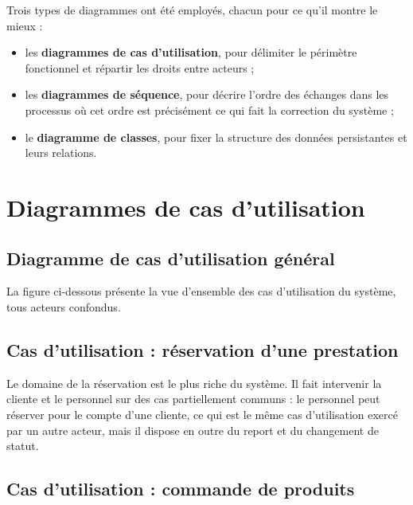 Trois types de diagrammes ont été employés, chacun pour ce qu'il montre le
mieux :

\begin{itemize}[leftmargin=1.2cm]
  \item les \textbf{diagrammes de cas d'utilisation}, pour délimiter le
  périmètre fonctionnel et répartir les droits entre acteurs ;
  \item les \textbf{diagrammes de séquence}, pour décrire l'ordre des échanges
  dans les processus où cet ordre est précisément ce qui fait la correction du
  système ;
  \item le \textbf{diagramme de classes}, pour fixer la structure des données
  persistantes et leurs relations.
\end{itemize}

\section{Diagrammes de cas d'utilisation}

\subsection{Diagramme de cas d'utilisation général}

La figure ci-dessous présente la vue d'ensemble des cas d'utilisation du
système, tous acteurs confondus.


\subsection{Cas d'utilisation : réservation d'une prestation}

Le domaine de la réservation est le plus riche du système. Il fait intervenir
la cliente et le personnel sur des cas partiellement communs : le personnel
peut réserver pour le compte d'une cliente, ce qui est le même cas
d'utilisation exercé par un autre acteur, mais il dispose en outre du report et
du changement de statut.


\subsection{Cas d'utilisation : commande de produits}

